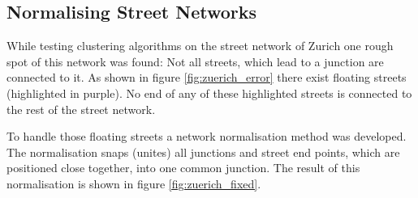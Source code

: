 \documentclass[11pt, a4paper]{report}
\begin{document}
\subsection{Normalising Street Networks}
While testing clustering algorithms on the street network of Zurich one rough spot of this network was found: Not all streets, which lead to a junction are connected to it. As shown in figure \ref{fig:zuerich_error} there exist floating streets (highlighted in purple). No end of any of these highlighted streets is connected to the rest of the street network.

To handle those floating streets a network normalisation method was developed. The normalisation snaps (unites) all junctions and street end points, which are positioned close together, into one common junction. The result of this normalisation is shown in figure \ref{fig:zuerich_fixed}.
\end{document}
